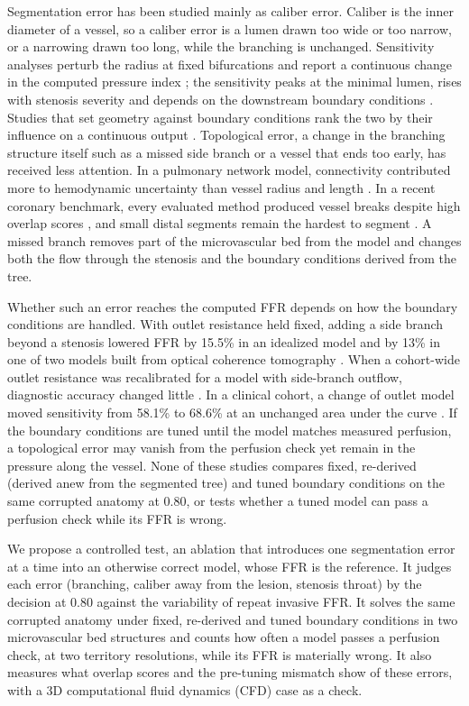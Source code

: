 \documentclass[journal,twoside,web]{ieeecolor}
\begin{document}
Segmentation error has been studied mainly as caliber error. Caliber is the inner diameter of a vessel, so a caliber error is a lumen drawn too wide or too narrow, or a narrowing drawn too long, while the branching is unchanged. Sensitivity analyses perturb the radius at fixed bifurcations and report a continuous change in the computed pressure index \cite{sankaran2015tmi,sankaran2015cmame,fernandez2024,dalmaso2025}; the sensitivity peaks at the minimal lumen, rises with stenosis severity \cite{fernandez2024} and depends on the downstream boundary conditions \cite{sankaran2015tmi}. Studies that set geometry against
boundary conditions rank the two by their influence on a continuous output \cite{sankaran2016,tanade2022,korte2023}. Topological error, a change in the branching structure itself such as a missed side branch or a vessel that ends too early, has received less attention. In a pulmonary network model, connectivity contributed more to hemodynamic uncertainty than vessel radius and
length \cite{colebank2019}. In a recent coronary benchmark, every evaluated method produced vessel breaks despite high overlap scores \cite{bransby2026}, and small distal segments remain the hardest to segment
\cite{chen2025}. A missed branch removes part of the microvascular bed from the model and changes both the flow
through the stenosis and the boundary conditions derived from the tree.

Whether such an error reaches the computed FFR depends on how the boundary conditions are handled. With outlet resistance held fixed, adding a side branch beyond a stenosis lowered FFR by 15.5\% in an idealized model and by 13\% in one of two models built from optical coherence tomography \cite{gamage2022}. When a cohort-wide outlet resistance was recalibrated for a model with side-branch outflow, diagnostic accuracy changed little \cite{gosling2020}. In a clinical cohort, a change of outlet model moved sensitivity from 58.1\% to 68.6\% at an unchanged area under
the curve \cite{fossan2026}. If the boundary conditions are tuned until the model matches measured perfusion, a topological error may vanish
from the perfusion check yet remain in the pressure along the vessel. None of these studies compares fixed, re-derived (derived anew from the segmented tree) and tuned boundary conditions on the same corrupted anatomy at
0.80, or tests whether a tuned model can pass a perfusion check while its FFR is wrong.

We propose a controlled test, an ablation that introduces one segmentation error at a time into an otherwise correct
model, whose FFR is the reference. It judges each error (branching, caliber away from the lesion, stenosis throat) by the decision at 0.80 against the variability of repeat invasive FFR. It solves the same corrupted anatomy under fixed, re-derived and tuned boundary conditions in two microvascular bed structures and counts how often a model passes a perfusion check, at two territory resolutions, while its FFR is materially wrong. It also measures what overlap scores and the pre-tuning mismatch show of these errors, with a 3D computational fluid dynamics (CFD) case as a check.
\end{document}

